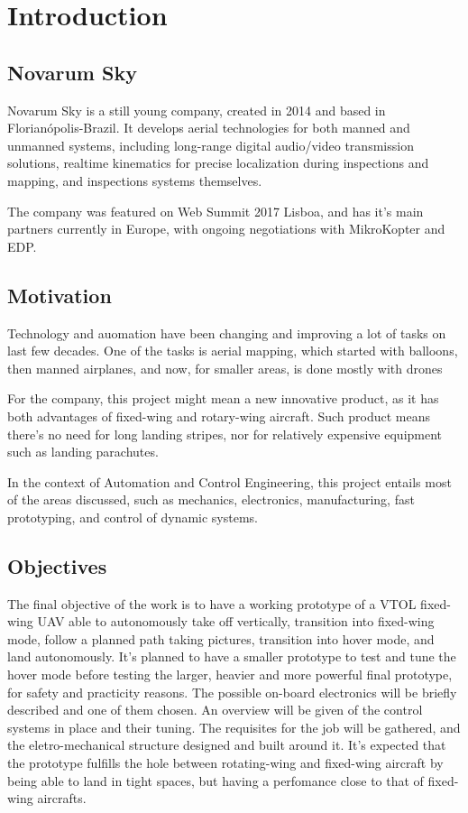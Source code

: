 

\chapter{Introduction} \label{chap:Introduction}


\section{Novarum Sky}
	Novarum Sky is a still young company, created in 2014 and based in Florianópolis-Brazil. It develops aerial technologies for both manned and unmanned systems, including long-range digital audio/video transmission solutions, realtime kinematics for precise localization during inspections and mapping, and inspections systems themselves.

The company was featured on Web Summit 2017 Lisboa, and has it's main partners currently in Europe, with ongoing negotiations with MikroKopter and EDP.

\section{Motivation}
Technology and auomation have been changing and improving a lot of tasks on last few decades.
%
One of the tasks is aerial mapping, which started with balloons, then manned airplanes, and now, for smaller areas, is done mostly with drones
%

For the company, this project might mean a new innovative product, as it has both advantages of fixed-wing and rotary-wing aircraft.
Such product means there's no need for long landing stripes, nor for relatively expensive equipment such as landing parachutes.
%

In the context of Automation and Control Engineering, this project entails most of the areas discussed, such as mechanics, electronics, manufacturing, fast prototyping, and control of dynamic systems.
%	


\section{Objectives}

%
The final objective of the work is to have a working prototype of a VTOL fixed-wing UAV able to autonomously take off vertically, transition into fixed-wing mode, follow a planned path taking pictures, transition into hover mode, and land autonomously.
%
It's planned to have a smaller prototype to test and tune the hover mode before testing the larger, heavier and more powerful final prototype, for safety and practicity reasons.
%
The possible on-board electronics will be briefly described and one of them chosen.
%
An overview will be given of the control systems in place and their tuning.
%
The requisites for the job will be gathered, and the eletro-mechanical structure designed and built around it.
%
It's expected that the prototype fulfills the hole between rotating-wing and fixed-wing aircraft by being able to land in tight spaces, but having a perfomance close to that of fixed-wing aircrafts. 


